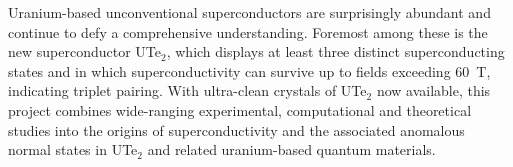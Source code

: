 \onecolumngrid

\begin{mdframed}[hidealllines=true,backgroundcolor=blue!5,innerleftmargin=5pt,innerrightmargin=5pt,innertopmargin=5pt,innerbottommargin=5pt]
\noindent
Uranium-based unconventional superconductors are surprisingly abundant and continue to defy a comprehensive understanding. Foremost among these is the new superconductor UTe$_2$,  which displays at least three distinct superconducting states and in which superconductivity can survive up to fields exceeding \SI{60}{\tesla}, indicating triplet pairing. With ultra-clean crystals of UTe$_2$ now available, this project combines wide-ranging experimental, computational and theoretical studies into the origins of superconductivity and the associated anomalous normal states in UTe$_2$ and related uranium-based quantum materials. %
\end{mdframed}
  
